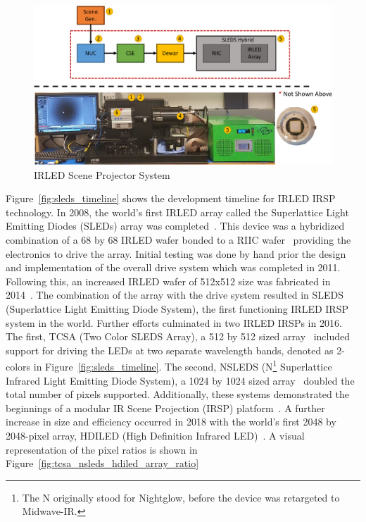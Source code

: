     \begin{figure}
        \centering
        \includegraphics[width=1.0\textwidth]{fig/sleds_system.pdf}
        \caption{IRLED Scene Projector System}
        \label{fig:sleds_system}
    \end{figure}

    Figure~\ref{fig:sleds_timeline} shows the development timeline for IRLED IRSP technology. In 2008, the world's first IRLED array called the Superlattice Light Emitting Diodes (SLEDs) array was completed~\cite{AhmedEtAl2019}. This device was a hybridized combination of a 68 by 68 IRLED wafer bonded to a RIIC wafer~\cite{DasEtAl2009} providing the electronics to drive the array. Initial testing was done by hand prior the design and implementation of the overall drive system which was completed in 2011. Following this, an increased IRLED wafer of 512x512 size was fabricated in 2014~\cite{NortonEtAl2013}. The combination of the array with the drive system resulted in SLEDS (Superlattice Light Emitting Diode System), the first functioning IRLED IRSP system in the world. Further efforts culminated in two IRLED IRSPs in 2016. The first, TCSA (Two Color SLEDS Array), a 512 by 512 sized array~\cite{McGeeEtAl2015, EjzakEtAl2016, EjzakEtAl2016_2, EjzakEtAl2017, RickerEtAl2017} included support for driving the LEDs at two separate wavelength bands, denoted as 2-colors in Figure~\ref{fig:sleds_timeline}. The second, NSLEDS (N\footnote{The N originally stood for Nightglow, before the device was retargeted to Midwave-IR.} Superlattice Infrared Light Emitting Diode System), a 1024 by 1024 sized array~\cite{BenedictEtAl2017,AhmedEtAl2020} doubled the total number of pixels supported. Additionally, these systems demonstrated the beginnings of a modular IR Scene Projection (IRSP) platform~\cite{BrowningEtAl2019}. A further increase in size and efficiency occurred in 2018 with the world's first 2048 by 2048-pixel array, HDILED (High Definition Infrared LED)~\cite{BenedictEtAl2018}. A visual representation of the pixel ratios is shown in Figure~\ref{fig:tcsa_nsleds_hdiled_array_ratio}

